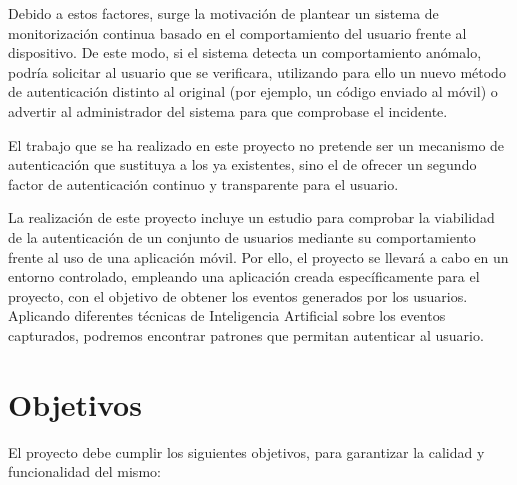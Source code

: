 Debido a estos factores, surge la motivación de plantear un sistema de monitorización continua basado en el comportamiento del usuario frente al dispositivo.  De este modo, si el sistema detecta un comportamiento anómalo, podría solicitar al usuario que se verificara, utilizando para ello un nuevo método de autenticación distinto al original (por ejemplo, un código enviado al móvil) o advertir al administrador del sistema para que comprobase el incidente.


El trabajo que se ha realizado en este proyecto no pretende ser un mecanismo de autenticación que sustituya a los ya existentes, sino el de ofrecer un segundo factor de autenticación continuo y transparente para el usuario.

La realización de este proyecto incluye un estudio para comprobar la viabilidad  de la autenticación de un conjunto de usuarios mediante su comportamiento frente al uso de una aplicación móvil. Por ello, el proyecto se llevará a cabo en un entorno controlado, empleando una aplicación creada específicamente para el proyecto, con el objetivo de obtener los eventos generados por los usuarios. Aplicando diferentes técnicas de Inteligencia Artificial sobre los eventos capturados, podremos encontrar patrones que permitan autenticar al usuario.


\section{Objetivos}
El proyecto debe cumplir los siguientes objetivos, para garantizar la calidad y funcionalidad del mismo:

